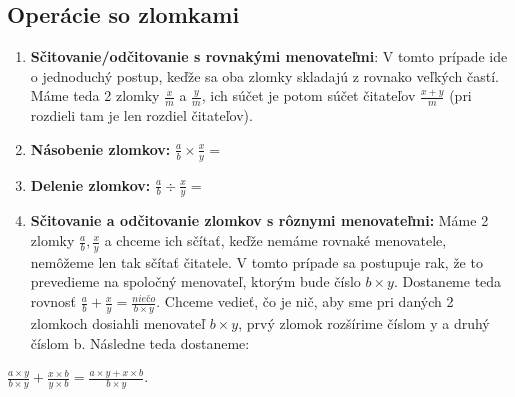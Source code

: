 \documentclass[12pt]{article}
\begin{document}
	\newpage
	\subsection{Operácie so zlomkami}
	\begin{enumerate}
		\item \textbf{Sčitovanie/odčitovanie s rovnakými menovateľmi}: V tomto prípade ide o jednoduchý postup, keďže sa oba zlomky skladajú z rovnako veľkých častí. Máme teda 2 zlomky $\frac{x}{m}$ a $\frac{y}{m}$, ich súčet je potom súčet čitateľov $\frac{x+y}{m}$ (pri rozdieli tam je len rozdiel čitateľov).
		
		\item \textbf{Násobenie zlomkov:} $\frac{a}{b} \times \frac{x}{y} = $
		\item \textbf{Delenie zlomkov:} $\frac{a}{b} \div \frac{x}{y} = $
		\item \textbf{Sčitovanie a odčitovanie zlomkov s rôznymi menovateľmi:} Máme 2 zlomky  $\frac{a}{b}, \frac{x}{y}$ a chceme ich sčítať, keďže nemáme rovnaké menovatele, nemôžeme len tak sčítať čitatele. V tomto prípade sa postupuje rak, že to prevedieme na spoločný menovateľ, ktorým bude číslo $b \times y$. Dostaneme teda rovnosť $\frac{a}{b} + \frac{x}{y} = \frac{niečo}{b \times y}$. Chceme vedieť, čo je nič, aby sme pri daných 2 zlomkoch dosiahli menovateľ $b \times y$, prvý zlomok rozšírime číslom y a druhý číslom b. Následne teda dostaneme:
	\end{enumerate}
	\begin{center}
		\LARGE $\frac{a \times y}{b \times y} + \frac{x \times b}{y \times b} = \frac{a \times y + x \times b}{b \times y}$.
		
	\end{center}
	
\end{document}
